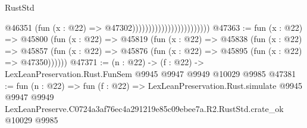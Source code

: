 \begin{lexlean}{RustStd}
\begin{coremodule}
                                                @46351
                                                  (fun (x : @22) => @47302))))))))))))))))))))))))
@47363 := fun (x : @22) =>
  @45800
    (fun (x : @22) =>
    @45819
      (fun (x : @22) =>
      @45838
        (fun (x : @22) =>
        @45857 (fun (x : @22) => @45876 (fun (x : @22) => @45895 (fun (x : @22) => @47350))))))
@47371 := (n : @22) -> (f : @22) -> LexLeanPreservation.Rust.FunSem @9945 @9947 @9949 @10029 @9985
@47381 := fun (n : @22) =>
  fun (f : @22) =>
  LexLeanPreservation.Rust.simulate
    @9945
    @9947
    @9949
    LexLeanPreserve.C0724a3af76ec4a291219e85c09ebee7a.R2.RustStd.crate_ok
    @10029
    @9985
\end{coremodule}
\end{lexlean}
